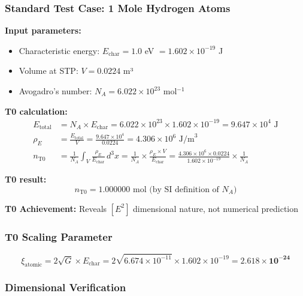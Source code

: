 \documentclass[12pt,a4paper]{article}
\newcommand{\xipar}{\xi}
\newcommand{\rhoE}{\rho_E}
\newcommand{\Echar}{E_{\text{char}}}
\begin{document}
	\subsubsection{Standard Test Case: 1 Mole Hydrogen Atoms}
	\label{subsubsec:mol_hydrogen_test}
	
	\textbf{Input parameters:}
	\begin{itemize}
		\item Characteristic energy: $\Echar = 1.0$ eV $= 1.602 \times 10^{-19}$ J
		\item Volume at STP: $V = 0.0224$ m³
		\item Avogadro's number: $N_A = 6.022 \times 10^{23}$ mol$^{-1}$
	\end{itemize}
	
	\textbf{T0 calculation:}
	\begin{align}
		E_{\text{total}} &= N_A \times \Echar = 6.022 \times 10^{23} \times 1.602 \times 10^{-19} = 9.647 \times 10^{4} \text{ J} \\
		\rhoE &= \frac{E_{\text{total}}}{V} = \frac{9.647 \times 10^{4}}{0.0224} = 4.306 \times 10^{6} \text{ J/m}^3 \\
		n_{\text{T0}} &= \frac{1}{N_A} \int_V \frac{\rhoE}{\Echar} \, d^3x = \frac{1}{N_A} \times \frac{\rhoE \times V}{\Echar} = \frac{4.306 \times 10^{6} \times 0.0224}{1.602 \times 10^{-19}} \times \frac{1}{N_A}
	\end{align}
	
	\textbf{T0 result:}
	\begin{equation}
		\boxed{n_{\text{T0}} = 1.000000 \text{ mol (by SI definition of } N_A\text{)}}
		\label{eq:mol_t0_result}
	\end{equation}
	
	\textbf{T0 Achievement:} Reveals $[E^2]$ dimensional nature, not numerical prediction
	
	\subsubsection{T0 Scaling Parameter}
	\label{subsubsec:mol_scaling_parameter}
	
	\begin{equation}
		\xipar_{\text{atomic}} = 2\sqrt{G} \times \Echar = 2\sqrt{6.674 \times 10^{-11}} \times 1.602 \times 10^{-19} = \mathbf{2.618 \times 10^{-24}}
		\label{eq:xi_atomic_calculated}
	\end{equation}
	
	\subsubsection{Dimensional Verification}
	\label{subsubsec:mol_dimensional_verification}
	
\end{document}

